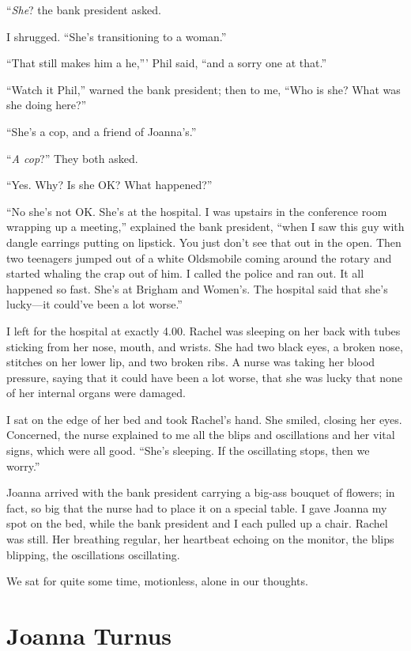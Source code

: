 ``\emph{She}? the bank president asked.

I shrugged. ``She's transitioning to a woman.''

``That still makes him a he,''' Phil said, ``and a sorry one at that.''

``Watch it Phil,'' warned the bank president; then to me, ``Who is she?
What was she doing here?''

``She's a cop, and a friend of Joanna's.''

``\emph{A cop}?'' They both asked.

``Yes. Why? Is she OK? What happened?''

``No she's not OK. She's at the hospital. I was upstairs in the
conference room wrapping up a meeting,'' explained the bank president,
``when I saw this guy with dangle earrings putting on lipstick. You just
don't see that out in the open. Then two teenagers jumped out of a white
Oldsmobile coming around the rotary and started whaling the crap out of
him. I called the police and ran out. It all happened so fast. She's at
Brigham and Women's. The hospital said that she's lucky---it could've
been a lot worse.''

I left for the hospital at exactly 4.00. Rachel was sleeping on her back
with tubes sticking from her nose, mouth, and wrists. She had two black
eyes, a broken nose, stitches on her lower lip, and two broken ribs. A
nurse was taking her blood pressure, saying that it could have been a
lot worse, that she was lucky that none of her internal organs were
damaged.

I sat on the edge of her bed and took Rachel's hand. She smiled, closing
her eyes. Concerned, the nurse explained to me all the blips and
oscillations and her vital signs, which were all good. ``She's sleeping.
If the oscillating stops, then we worry.''

Joanna arrived with the bank president carrying a big-ass bouquet of
flowers; in fact, so big that the nurse had to place it on a special
table. I gave Joanna my spot on the bed, while the bank president and I
each pulled up a chair. Rachel was still. Her breathing regular, her
heartbeat echoing on the monitor, the blips blipping, the oscillations
oscillating.

We sat for quite some time, motionless, alone in our thoughts.

\chapter{Joanna Turnus}

